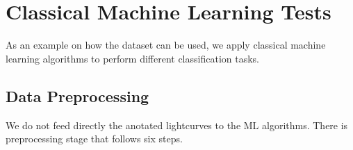 \documentclass[a4paper,fleqn,usenatbib]{mnras}
\begin{document}




\section{Classical Machine Learning Tests} \label{section_method}

As an example on how the dataset can be used, we apply classical
machine learning algorithms to perform different classification tasks.


\subsection{Data Preprocessing}
We do not feed directly the anotated lightcurves to the ML algorithms.
There is preprocessing stage that follows six steps.
\end{document}
